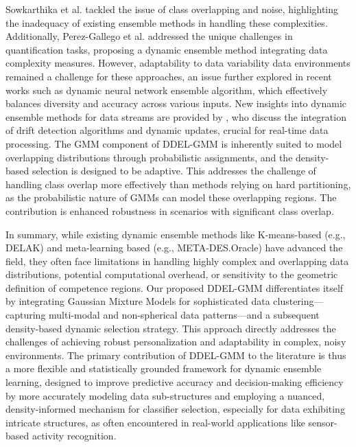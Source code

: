 \documentclass[lettersize,journal]{IEEEtran}
\newcommand{\greenhighlight}[1]{\textcolor{highlightgreen}{#1}}
\begin{document}
Sowkarthika et al. \cite{b_data_2023} tackled the issue of class overlapping and noise, highlighting the inadequacy of existing ensemble methods in handling these complexities. Additionally, Perez-Gallego et al. \cite{perez-gallego_dynamic_2019} addressed the unique challenges in quantification tasks, proposing a dynamic ensemble method integrating data complexity measures. However, adaptability to data variability data environments remained a challenge for these approaches, an issue further explored in recent works such as \cite{alam_dynamic_2020} dynamic neural network ensemble algorithm, which effectively balances diversity and accuracy across various inputs. New insights into dynamic ensemble methods for data streams are provided by \cite{gomes_survey_2017}, who discuss the integration of drift detection algorithms and dynamic updates, crucial for real-time data processing. \greenhighlight{The GMM component of DDEL-GMM is inherently suited to model overlapping distributions through probabilistic assignments, and the density-based selection is designed to be adaptive. This addresses the challenge of handling class overlap more effectively than methods relying on hard partitioning, as the probabilistic nature of GMMs can model these overlapping regions. The contribution is enhanced robustness in scenarios with significant class overlap.}

\greenhighlight{In summary, while existing dynamic ensemble methods like K-means-based (e.g., DELAK) and meta-learning based (e.g., META-DES.Oracle) have advanced the field, they often face limitations in handling highly complex and overlapping data distributions, potential computational overhead, or sensitivity to the geometric definition of competence regions. Our proposed DDEL-GMM differentiates itself by integrating Gaussian Mixture Models for sophisticated data clustering—capturing multi-modal and non-spherical data patterns—and a subsequent density-based dynamic selection strategy. This approach directly addresses the challenges of achieving robust personalization and adaptability in complex, noisy environments. The primary contribution of DDEL-GMM to the literature is thus a more flexible and statistically grounded framework for dynamic ensemble learning, designed to improve predictive accuracy and decision-making efficiency by more accurately modeling data sub-structures and employing a nuanced, density-informed mechanism for classifier selection, especially for data exhibiting intricate structures, as often encountered in real-world applications like sensor-based activity recognition.}
\end{document}
